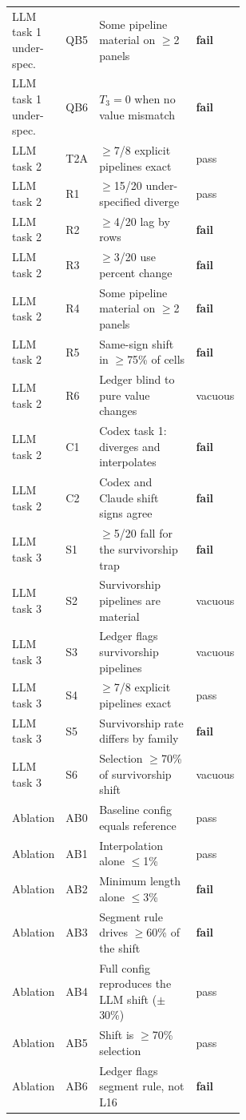 \begin{longtable}{llp{0.58\linewidth}l}
LLM task 1 under-spec. & QB5 & Some pipeline material on $\ge$2 panels & \textbf{fail} \\
LLM task 1 under-spec. & QB6 & $T_3=0$ when no value mismatch & \textbf{fail} \\
LLM task 2 & T2A & $\ge$7/8 explicit pipelines exact & pass \\
LLM task 2 & R1 & $\ge$15/20 under-specified diverge & pass \\
LLM task 2 & R2 & $\ge$4/20 lag by rows & \textbf{fail} \\
LLM task 2 & R3 & $\ge$3/20 use percent change & \textbf{fail} \\
LLM task 2 & R4 & Some pipeline material on $\ge$2 panels & \textbf{fail} \\
LLM task 2 & R5 & Same-sign shift in $\ge$75\% of cells & \textbf{fail} \\
LLM task 2 & R6 & Ledger blind to pure value changes & vacuous \\
LLM task 2 & C1 & Codex task 1: diverges and interpolates & \textbf{fail} \\
LLM task 2 & C2 & Codex and Claude shift signs agree & \textbf{fail} \\
LLM task 3 & S1 & $\ge$5/20 fall for the survivorship trap & \textbf{fail} \\
LLM task 3 & S2 & Survivorship pipelines are material & vacuous \\
LLM task 3 & S3 & Ledger flags survivorship pipelines & vacuous \\
LLM task 3 & S4 & $\ge$7/8 explicit pipelines exact & pass \\
LLM task 3 & S5 & Survivorship rate differs by family & \textbf{fail} \\
LLM task 3 & S6 & Selection $\ge$70\% of survivorship shift & vacuous \\
Ablation & AB0 & Baseline config equals reference & pass \\
Ablation & AB1 & Interpolation alone $\le$1\% & pass \\
Ablation & AB2 & Minimum length alone $\le$3\% & \textbf{fail} \\
Ablation & AB3 & Segment rule drives $\ge$60\% of the shift & \textbf{fail} \\
Ablation & AB4 & Full config reproduces the LLM shift ($\pm$30\%) & pass \\
Ablation & AB5 & Shift is $\ge$70\% selection & pass \\
Ablation & AB6 & Ledger flags segment rule, not L16 & \textbf{fail} \\

\end{longtable}
